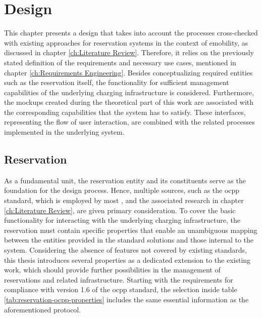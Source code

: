 
\chapter{Design}
\label{ch:Design}

This chapter presents a design that takes into account the processes cross-checked with existing approaches for reservation systems in the context of \acrshort{emobility}, as discussed in chapter \ref{ch:Literature Review}. Therefore, it relies on the previously stated definition of the requirements and necessary use cases, mentioned in chapter \ref{ch:Requirements Engineering}.
Besides conceptualizing required entities such as the reservation itself, the functionality for sufficient management capabilities of the underlying charging infrastructure is considered.
Furthermore, the mockups created during the theoretical part of this work are associated with the corresponding capabilities that the system has to satisfy. These interfaces, representing the flow of user interaction, are combined with the related processes implemented in the underlying system.

\section{Reservation}
\label{ch:Design:sec:Reservation}

As a fundamental unit, the reservation entity and its constituents serve as the foundation for the design process.  
Hence, multiple sources, such as the \acrshort{ocpp} standard, which is employed by most , and the associated research in chapter \ref{ch:Literature Review}, are given primary consideration.
To cover the basic functionality for interacting with the underlying charging infrastructure, the reservation must contain specific properties that enable an unambiguous mapping between the entities provided in the standard solutions and those internal to the system.
Considering the absence of features not covered by existing standards, this thesis introduces several properties as a dedicated extension to the existing work, which should provide further possibilities in the management of reservations and related infrastructure.
Starting with the requirements for compliance with version 1.6 of the \acrshort{ocpp} standard, the selection inside table \ref{tab:reservation-ocpp-properties} includes the same essential information as the aforementioned protocol.

